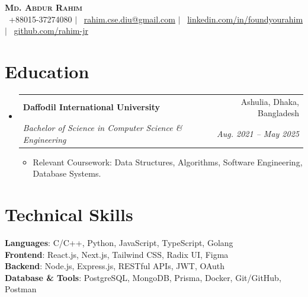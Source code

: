 \documentclass[a4paper,11pt]{article}
\makeatletter
\newcommand{\resumeItem}[1]{
  \item\small{
    {#1 \vspace{-2pt}}
  }
}
\newcommand{\resumeSubheading}[4]{
  \vspace{-1.5pt}\item
    \begin{tabular*}{0.97\textwidth}[t]{l@{\extracolsep{\fill}}r}
      \textbf{#1} & #2 \\
      \textit{\small#3} & \textit{\small #4} \\
    \end{tabular*}\vspace{-6pt}
}
\newcommand{\resumeSubHeadingListStart}{\begin{itemize}[leftmargin=0.15in, label={}]}
\newcommand{\resumeSubHeadingListEnd}{\end{itemize}}
\newcommand{\resumeItemListStart}{\begin{itemize}}
\newcommand{\resumeItemListEnd}{\end{itemize}\vspace{-4pt}}
\makeatother
\begin{document}
\begin{center}
    \textbf{\Huge \scshape Md. Abdur Rahim} \\ \vspace{2pt}
    \small \faPhone \ +88015-37274080 $|$ \faEnvelope \ \href{mailto:rahim.cse.diu@gmail.com}{rahim.cse.diu@gmail.com} $|$ 
    \faLinkedin \ \href{https://www.linkedin.com/in/foundyourahim/}{linkedin.com/in/foundyourahim} $|$
    \faGithub \ \href{https://github.com/rahim-jr}{github.com/rahim-jr}
\end{center}

\section{Education}
  \resumeSubHeadingListStart
    \resumeSubheading
      {Daffodil International University}{Ashulia, Dhaka, Bangladesh}
      {Bachelor of Science in Computer Science \& Engineering}{Aug. 2021 -- May 2025}
      \resumeItemListStart
        \resumeItem{Relevant Coursework: Data Structures, Algorithms, Software Engineering, Database Systems.}
      \resumeItemListEnd
  \resumeSubHeadingListEnd

\section{Technical Skills}
 \begin{itemize}[leftmargin=0.15in, label={}]
    \small{\item{
     \textbf{Languages}{: C/C++, Python, JavaScript, TypeScript, Golang} \\
     \textbf{Frontend}{: React.js, Next.js, Tailwind CSS, Radix UI, Figma} \\
     \textbf{Backend}{: Node.js, Express.js, RESTful APIs, JWT, OAuth} \\
     \textbf{Database \& Tools}{: PostgreSQL, MongoDB, Prisma, Docker, Git/GitHub, Postman}
    }}
 \end{itemize}

\end{document}

